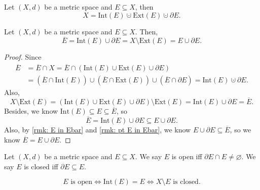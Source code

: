 \begin{proposition}
    Let \((X, d)\) be a metric space and \(E \subseteq X\), then 
    \[
        X = \mathrm{Int}(E) \cupdot \mathrm{Ext}(E) \cupdot \partial E. 
    \]  
\end{proposition}

\begin{corollary}
    Let \((X,d)\) be a metric space and \(E \subseteq X\). Then, 
    \[
        \overline{E} = \mathrm{Int}(E) \cup \partial E = X \setminus \mathrm{Ext}(E) = E \cup \partial E.    
    \] 
\end{corollary}
\begin{proof}
    Since
    \begin{align*}
        \overline{E} &= \overline{E} \cap X = \overline{E} \cap (\mathrm{Int}(E) \cup \mathrm{Ext}(E) \cup \partial E) \\
        &= \left( \overline{E} \cap \mathrm{Int}(E)   \right) \cup \left( \overline{E} \cap \mathrm{Ext}(E)   \right) \cup \left( \overline{E} \cap \partial E  \right) = \mathrm{Int}(E) \cupdot \partial E.   
    \end{align*}
    Also,
    \[
        X \setminus \mathrm{Ext}(E) = \left( \mathrm{Int}(E) \cup \mathrm{Ext}(E) \cup \partial E   \right) \setminus \mathrm{Ext}(E) = \mathrm{Int}(E) \cup \partial E = \overline{E}.   
    \]  
    Besides, we know \(\mathrm{Int}(E) \subseteq E \subseteq \overline{E}  \), so 
    \[
        \overline{E} = \mathrm{Int}(E) \cup \partial E \subseteq E \cup \partial E.    
    \] Also, by \autoref{rmk: E in Ebar} and \autoref{rmk: pt E in Ebar}, we know \(E \cup \partial E \subseteq \overline{E} \), so we know \(\overline{E} = E \cup \partial E \).    
\end{proof}

\begin{definition}
    Let \((X, d)\) be a metric space and \(E \subseteq X\). We say \(E\) is open iff \(\partial E \cap E \neq \varnothing \). We say \(E\) is closed iff \(\partial E \subseteq E\).      
\end{definition}

\begin{proposition} \label{proposition: open set equivalent condition}
    \[
        E \text{ is open} \iff \mathrm{Int}(E) = E \iff X \setminus E \text{ is closed.} 
    \]
\end{proposition}


